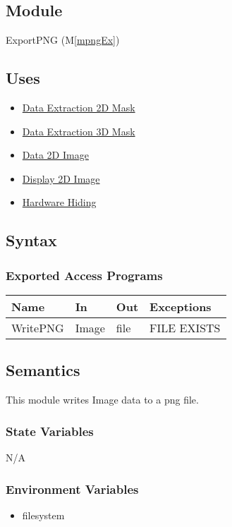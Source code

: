\documentclass[12pt, titlepage]{article}
\newcommand{\mref}[1]{M\ref{#1}}
\begin{document}
\subsection{Module}

ExportPNG (\mref{mpngEx})

\subsection{Uses}
\begin{itemize}
    \item \hyperref[Mod:Mask2D]{Data Extraction 2D Mask}
    \item \hyperref[Mod:Mask3D]{Data Extraction 3D Mask}
    \item \hyperref[Mod:Image]{Data 2D Image}
    \item \hyperref[Mod:Disp1D]{Display 2D Image}
    \item \hyperref[Mod:HH]{Hardware Hiding}
\end{itemize}

\subsection{Syntax}

\subsubsection{Exported Access Programs}

\begin{center}
    \begin{tabular}{p{2cm} p{4cm} p{4cm} p{4cm}}
        \hline
        \textbf{Name} & \textbf{In} & \textbf{Out} & \textbf{Exceptions} \\
        \hline
        WritePNG & Image & file & FILE EXISTS \\
        \hline
    \end{tabular}
\end{center}

\subsection{Semantics}
This module writes Image data to a png file.

\subsubsection{State Variables}
N/A

\subsubsection{Environment Variables}
\begin{itemize}
    \item filesystem
\end{itemize}
\end{document}
